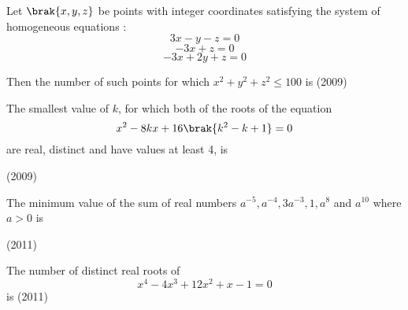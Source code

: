 \iffalse
  \title{Assignment}
  \author{AI24BTECH11022 - Pabbuleti Venkata Charan Teja}
  \section{integer}
\fi


\item 
Let $\brak{x,y,z}$ be points with integer coordinates satisfying the system of homogeneous equations : $$3x-y-z=0$$$$-3x+z=0$$$$-3x+2y+z=0$$

Then the number of such points for which ${x^{2}+y^{2}+z^{2}\leq100}$ is \hfill(2009)

\item 
The smallest value of $k$, for which both of the roots of the equation $$x^{2}-8kx+16\brak{k^{2}-k+1}=0$$
are real, distinct and have values at least 4, is 

\hfill(2009)

\item 
The minimum value of the sum of real numbers $a^{-5},a^{-4},3a^{-3},1,a^{8}$ and $a^{10}$ where $a>0$ is

\hfill(2011)

\item 
The number of distinct real roots of $$x^{4}-4x^{3}+12x^{2}+x-1=0$$ is \hfill(2011)
